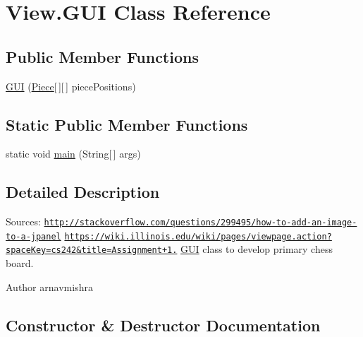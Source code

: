\hypertarget{class_view_1_1_g_u_i}{}\section{View.\+G\+UI Class Reference}
\label{class_view_1_1_g_u_i}
\subsection*{Public Member Functions}
\begin{DoxyCompactItemize}
\item 
\hyperlink{class_view_1_1_g_u_i_a7a4bdade50043a2fc96ff3e7a6c13da8}{G\+UI} (\hyperlink{class_model_1_1_pieces_1_1_piece}{Piece}\mbox{[}$\,$\mbox{]}\mbox{[}$\,$\mbox{]} piece\+Positions)
\end{DoxyCompactItemize}
\subsection*{Static Public Member Functions}
\begin{DoxyCompactItemize}
\item 
static void \hyperlink{class_view_1_1_g_u_i_ab66997d351c41f53de8f3ee0ba838748}{main} (String\mbox{[}$\,$\mbox{]} args)
\end{DoxyCompactItemize}


\subsection{Detailed Description}
Sources\+: \href{http://stackoverflow.com/questions/299495/how-to-add-an-image-to-a-jpanel}{\tt http\+://stackoverflow.\+com/questions/299495/how-\/to-\/add-\/an-\/image-\/to-\/a-\/jpanel} \href{https://wiki.illinois.edu/wiki/pages/viewpage.action?spaceKey=cs242&title=Assignment+1.1}{\tt https\+://wiki.\+illinois.\+edu/wiki/pages/viewpage.\+action?space\+Key=cs242\&title=\+Assignment+1.} \hyperlink{class_view_1_1_g_u_i}{G\+UI} class to develop primary chess board. \begin{DoxyAuthor}{Author}
arnavmishra 
\end{DoxyAuthor}


\subsection{Constructor \& Destructor Documentation}
\hypertarget{class_view_1_1_g_u_i_a7a4bdade50043a2fc96ff3e7a6c13da8}{}\label{class_view_1_1_g_u_i_a7a4bdade50043a2fc96ff3e7a6c13da8} 
